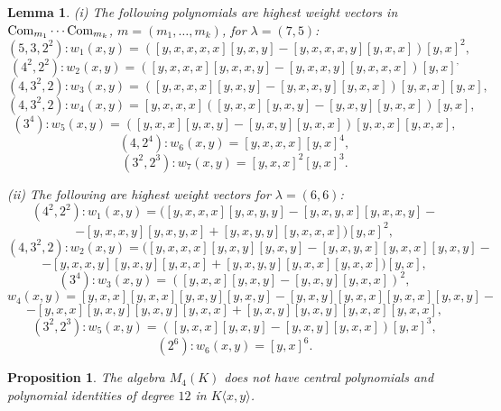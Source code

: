 \documentclass[12pt]{amsart}
\newtheorem{lemma}[theorem]{Lemma}
\newtheorem{proposition}[theorem]{Proposition}
\theoremstyle{definition}
\begin{document}
\begin{lemma}\label{HWV of degree 12}
{\rm (i)} The following polynomials are highest weight vectors in $\text{\rm Com}_{m_1}\cdots \text{\rm Com}_{m_k}$, $m=(m_1,\ldots,m_k)$, for $\lambda=(7,5)$:
\[
(5,3,2^2):w_1(x,y)=([y,x,x,x,x][y,x,y]-[y,x,x,x,y][y,x,x])[y,x]^2, %
\]
\[
(4^2,2^2):w_2(x,y)=([y,x,x,x][y,x,x,y]-[y,x,x,y][y,x,x,x])[y,x]^, %
\]
\[
(4,3^2,2):w_3(x,y)=([y,x,x,x][y,x,y]-[y,x,x,y][y,x,x])[y,x,x][y,x], %
\]
\[
(4,3^2,2):w_4(x,y)=[y,x,x,x]([y,x,x][y,x,y]-[y,x,y][y,x,x])[y,x], %
\]
\[
(3^4):w_5(x,y)=([y,x,x][y,x,y]-[y,x,y][y,x,x])[y,x,x][y,x,x],%
\]
\[
(4,2^4):w_6(x,y)=[y,x,x,x][y,x]^4,%
\]
\[
(3^2,2^3):w_7(x,y)=[y,x,x]^2[y,x]^3. %
\]

{\rm (ii)} The following are highest weight vectors for $\lambda=(6,6)$:
\[
(4^2,2^2):w_1(x,y)=([y,x,x,x][y,x,y,y]-[y,x,y,x][y,x,x,y]-
\]
\[
-[y,x,x,y][y,x,y,x]+[y,x,y,y][y,x,x,x])[y,x]^2,
\]
\[
(4,3^2,2):w_2(x,y)=([y,x,x,x][y,x,y][y,x,y]-[y,x,y,x][y,x,x][y,x,y]-
\]
\[
-[y,x,x,y][y,x,y][y,x,x]+[y,x,y,y][y,x,x][y,x,x])[y,x],
\]
\[
(3^4):w_3(x,y)=([y,x,x][y,x,y]-[y,x,y][y,x,x])^2,
\]
\[
w_4(x,y)=[y,x,x][y,x,x][y,x,y][y,x,y]-[y,x,y][y,x,x][y,x,x][y,x,y]-
\]
\[
-[y,x,x][y,x,y][y,x,y][y,x,x]+[y,x,y][y,x,y][y,x,x][y,x,x],
\]
\[
(3^2,2^3):w_5(x,y)=([y,x,x][y,x,y]-[y,x,y][y,x,x])[y,x]^3,
\]
\[
(2^6):w_6(x,y)=[y,x]^6.
\]
\end{lemma}

\begin{proposition}\label{no central polynomials of degree 12}
The algebra $M_4(K)$ does not have central polynomials and polynomial identities of degree $12$ in $K\langle x,y\rangle$.
\end{proposition}
\end{document}
